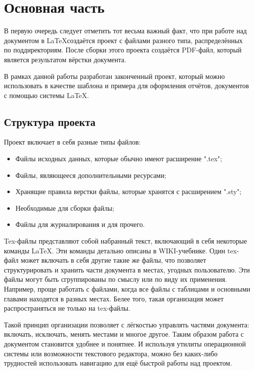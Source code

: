 \section{ Основная часть}
	В первую очередь следует отметить тот весьма важный факт, что при работе над документом в \LaTeX создаётся проект
	с файлами разного типа, распределённых по поддиректориям. После сборки этого проекта создаётся PDF-файл, который
	является результатом вёрстки документа\cite{norm2}.

	В рамках данной работы разработан законченный проект, который можно использовать в качестве шаблона и примера
	для оформления отчётов, документов с помощью системы \LaTeX.

	\subsection{Структура проекта}
		Проект включает в себя разные типы  файлов:
			\begin{itemize}
				\fontsize{0pt}{0pt}
				\setlength{\itemsep}{0pt}
				\item Файлы исходных данных, которые обычно имеют расширение ".tex"; 
				\item Файлы, являющееся дополнительными ресурсами;
				\item Хранящие правила верстки файлы, которые хранятся с расширением ".sty";
				\item Необходимые для сборки файлы;
				\item Файлы для журналирования и для прочего.
			\end{itemize}

			Tex-файлы представляют собой набранный текст, включающий в себя некоторые команды \LaTeX. Эти команды детально описаны
			в WIKI-учебнике. Один tex-файл может включать в себя другие такие же файлы, что позволяет структурировать и хранить 
			части документа в местах, угодных пользователю. Эти файлы могут быть сгруппированы по смыслу или по виду их 
			применения. Например, проще работать с файлами, когда все файлы с таблицами и основными главами находятся в
			разных местах. Белее того, такая организация может распространяться не только на tex-файлы.

			Такой принцип организации позволяет с лёгкостью управлять частями документа: включать, исключать, менять местами и многое другое.
			Таким образом работа с документом становится удобнее и понятнее. И используя утилиты операционной системы или возможности
			текстового редактора, можно без каких-либо трудностей использовать навигацию для ещё быстрой работы над проектом.

